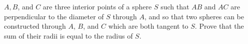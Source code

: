 $A,B$,  and $C$ are three interior points of a sphere $S$ such that $AB$ and $AC$ are perpendicular to the diameter of $S$ through $A$,  and so that two spheres can be constructed through $A$,  $B$,  and $C$ which are both tangent to $S$. Prove that the sum of their radii is equal to the radius of $S$.